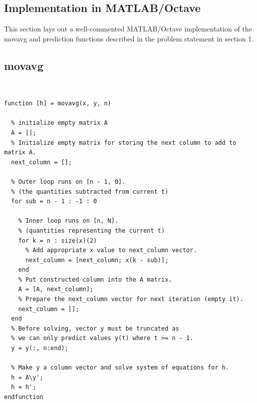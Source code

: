 \documentclass{article}
\begin{document}
\vspace{0.5cm}
\begin{flushleft}
\section{Implementation in MATLAB/Octave}
\begin{flushleft}
This section lays out a well-commented MATLAB/Octave implementation of the movavg and prediction functions described in the problem statement in section 1. \pagebreak
\subsection{movavg}\mbox{}\\
\end{flushleft}
\begin{footnotesize}
\begin{verbatim}
function [h] = movavg(x, y, n)

  % initialize empty matrix A
  A = [];
  % Initialize empty matrix for storing the next column to add to matrix A.
  next_column = [];
  
  % Outer loop runs on [n - 1, 0].
  % (the quantities subtracted from current t)
  for sub = n - 1 : -1 : 0
  
    % Inner loop runs on [n, N].
    % (quantities representing the current t)
    for k = n : size(x)(2)
      % Add appropriate x value to next_column vector.
      next_column = [next_column; x(k - sub)];
    end
    % Put constructed column into the A matrix.
    A = [A, next_column];
    % Prepare the next_column vector for next iteration (empty it).
    next_column = [];   
  end
  % Before solving, vector y must be truncated as
  % we can only predict values y(t) where t >= n - 1.
  y = y(:, n:end);
  
  % Make y a column vector and solve system of equations for h.
  h = A\y';
  h = h';
endfunction
\end{verbatim}
\end{footnotesize}
\end{flushleft}
\pagebreak
\end{document}
